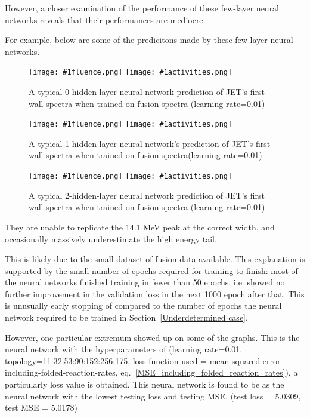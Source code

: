 \documentclass[a4paper, 12pt]{article}
\newcommand{\fluenceandactivities}[1]{
\texttt{[image: \#1fluence.png]}
\texttt{[image: \#1activities.png]}
}
\begin{document}
    However, a closer examination of the performance of these few-layer neural networks reveals that their performances are mediocre. 

    For example, below are some of the predicitons made by these few-layer neural networks.

\begin{figure}[H]
\centering
\fluenceandactivities{/home/ocean/Documents/GitHubDir/unfolding/unfolding/unfoldingsuite/neuralnetwork/realoutputEarlyStopping/SelectedNNreplicated/fusion-fusion-final/0927_0215_0_layerfinal_inv_0_test_001_}
\caption{A typical 0-hidden-layer neural network prediction of JET's first wall spectra when trained on fusion spectra (learning rate=0.01)}
\end{figure}

\begin{figure}[H]
\centering
\fluenceandactivities{/home/ocean/Documents/GitHubDir/unfolding/unfolding/unfoldingsuite/neuralnetwork/realoutputEarlyStopping/SelectedNNreplicated/fusion-fusion-final/0927_0217_1_layerfinal_inv_1_test_001_}
\caption{A typical 1-hidden-layer neural network's prediction of JET's first wall spectra when trained on fusion spectra(learning rate=0.01)}
\end{figure}

\begin{figure}
\centering
\fluenceandactivities{/home/ocean/Documents/GitHubDir/unfolding/unfolding/unfoldingsuite/neuralnetwork/realoutputEarlyStopping/SelectedNNreplicated/fusion-fusion/0927_0219_2_layerfinal_inv_2_test_001_}
\caption{A typical 2-hidden-layer neural network prediction of JET's first wall spectra when trained on fusion spectra (learning rate=0.01)}\label{3Layerfusion-fusionJET-FW}
\end{figure}

    They are unable to replicate the 14.1 MeV peak at the correct width, and occasionally massively underestimate the high energy tail.

    This is likely due to the small dataset of fusion data available. This explanation is supported by the small number of epochs required for training to finish: most of the neural networks finished training in fewer than 50 epochs, i.e. showed no further improvement in the validation loss in the next 1000 epoch after that. This is unusually early stopping of compared to the number of epochs the neural network required to be trained in Section~\ref{Underdetermined case}.

    However, one particular extremum showed up on some of the graphs. This is the neural network with the hyperparameters of (learning rate=0.01, topology=11:32:53:90:152:256:175, loss function used = mean-squared-error-including-folded-reaction-rates, eq.~\ref{MSE_including_folded_reaction_rates}), a particularly loss value is obtained. This neural network is found to be as the neural network with the lowest testing loss and testing MSE. (test loss = 5.0309, test MSE = 5.0178)
\end{document}
